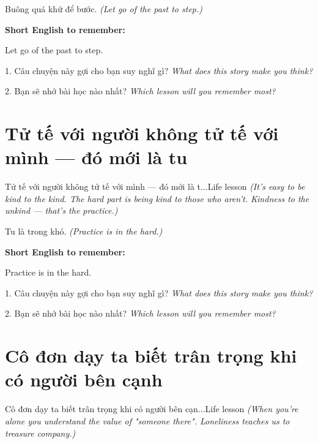 \begin{baihoc}
Buông quá khứ để bước.
\textit{(Let go of the past to step.)}
\end{baihoc}

\begin{ghinhoanh}
\textbf{Short English to remember:}

Let go of the past to step.

\end{ghinhoanh}

\begin{tuhocnhanh}
1. Câu chuyện này gợi cho bạn suy nghĩ gì? \textit{What does this story make you think?}

2. Bạn sẽ nhớ bài học nào nhất? \textit{Which lesson will you remember most?}
\end{tuhocnhanh}
\ngancach


\section{Tử tế với người không tử tế với mình — đó mới là tu}
\begin{truyen}{Tử tế với người không tử tế với mình — đó mới là t...}{Life lesson}
\textit{(It's easy to be kind to the kind. The hard part is being kind to those who aren't. Kindness to the unkind — that's the practice.)}
\end{truyen}

\begin{baihoc}
Tu là trong khó.
\textit{(Practice is in the hard.)}
\end{baihoc}

\begin{ghinhoanh}
\textbf{Short English to remember:}

Practice is in the hard.

\end{ghinhoanh}

\begin{tuhocnhanh}
1. Câu chuyện này gợi cho bạn suy nghĩ gì? \textit{What does this story make you think?}

2. Bạn sẽ nhớ bài học nào nhất? \textit{Which lesson will you remember most?}
\end{tuhocnhanh}
\ngancach


\section{Cô đơn dạy ta biết trân trọng khi có người bên cạnh}
\begin{truyen}{Cô đơn dạy ta biết trân trọng khi có người bên cạn...}{Life lesson}
\textit{(When you're alone you understand the value of "someone there". Loneliness teaches us to treasure company.)}
\end{truyen}

